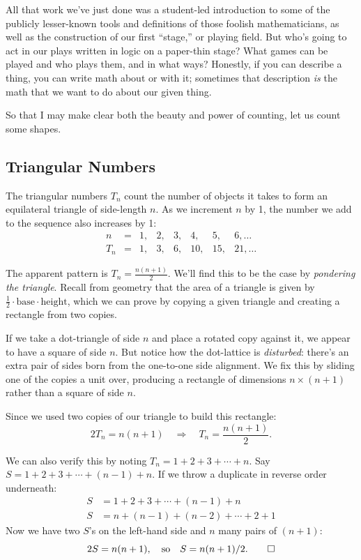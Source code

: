 All that work we've just done was a student-led introduction to some of the
publicly lesser-known tools and definitions of those foolish mathematicians, as
well as the construction of our first ``stage,'' or playing field. But who's
going to act in our plays written in logic on a paper-thin stage? What games
can be played and who plays them, and in what ways? Honestly, if you can
describe a thing, you can write math about or with it; sometimes that
description \emph{is} the math that we want to do about our given thing.

So that I may make clear both the beauty and power of counting, let us count
some shapes.

\subsection{Triangular Numbers}

The triangular numbers $T_n$ count the number of objects it takes to form an
equilateral triangle of side-length $n$. As we increment $n$ by 1, the number
we add to the sequence also increases by 1:
\[
    \begin{array}{cccccccc}
    n   &=& 1, & 2, & 3, & 4,  & 5,  & 6, \ldots \\
    T_n &=& 1, & 3, & 6, & 10, & 15, & 21, \ldots
    \end{array}
\]

The apparent pattern is $T_n = \frac{n(n+1)}{2}$. We'll find this to be the
case by \emph{pondering the triangle}. Recall from geometry that the area of a
triangle is given by $\frac{1}{2} \cdot \text{base} \cdot \text{height}$,
which we can prove by copying a given triangle and creating a rectangle from
two copies.

If we take a dot-triangle of side $n$ and place a rotated copy against it, we
appear to have a square of side $n$. But notice how the dot-lattice is
\emph{disturbed}: there's an extra pair of sides born from the one-to-one side
alignment. We fix this by sliding one of the copies a unit over, producing a
rectangle of dimensions $n \times (n+1)$ rather than a square of side $n$.

Since we used two copies of our triangle to build this rectangle:
\[
    2 T_n = n(n+1) \quad\Longrightarrow\quad T_n = \frac{n(n+1)}{2}.
\]

We can also verify this by noting $T_n = 1 + 2 + 3 + \cdots + n$. Say
$S = 1 + 2 + 3 + \cdots + (n-1) + n$. If we throw a duplicate in reverse
order underneath:
\begin{align*}
    S &= 1 + 2 + 3 + \cdots + (n-1) + n \\
    S &= n + (n-1) + (n-2) + \cdots + 2 + 1
\end{align*}
Now we have two $S$'s on the left-hand side and $n$ many pairs of $(n+1)$:
\[
    2S = n(n+1),\quad\text{so}\quad S = \frac{n(n+1)}{2}. \qed
\]

